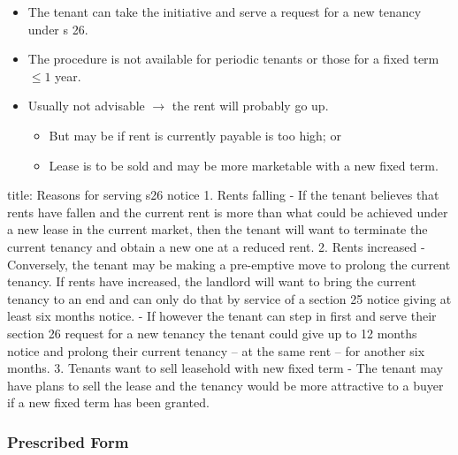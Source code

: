 \documentclass[
]{article}
\newenvironment{Shaded}{}{}
\newcommand{\NormalTok}[1]{#1}
\providecommand{\tightlist}{%
  \setlength{\itemsep}{0pt}\setlength{\parskip}{0pt}}
\begin{document}
\begin{itemize}
\tightlist
\item
  The tenant can take the initiative and serve a request for a new
  tenancy under s 26.
\item
  The procedure is not available for periodic tenants or those for a
  fixed term \(\leq 1\) year.
\item
  Usually not advisable \(\rightarrow\) the rent will probably go up.

  \begin{itemize}
  \tightlist
  \item
    But may be if rent is currently payable is too high; or
  \item
    Lease is to be sold and may be more marketable with a new fixed
    term.
  \end{itemize}
\end{itemize}

\begin{Shaded}
\begin{Highlighting}[]
\NormalTok{title: Reasons for serving s26 notice}
\NormalTok{1. Rents falling}
\NormalTok{    {-} If the tenant believes that rents have fallen and the current rent is more than what could be achieved under a new lease in the current market, then the tenant will want to terminate the current tenancy and obtain a new one at a reduced rent.}
\NormalTok{2. Rents increased}
\NormalTok{    {-} Conversely, the tenant may be making a pre{-}emptive move to prolong the current tenancy. If rents have increased, the landlord will want to bring the current tenancy to an end and can only do that by service of a section 25 notice giving at least six months\textquotesingle{} notice.}
\NormalTok{    {-} If however the tenant can step in first and serve their section 26 request for a new tenancy the tenant could give up to 12 months\textquotesingle{} notice and prolong their current tenancy – at the same rent – for another six months.}
\NormalTok{3. Tenants want to sell leasehold with new fixed term}
\NormalTok{    {-} The tenant may have plans to sell the lease and the tenancy would be more attractive to a buyer if a new fixed term has been granted.}
\end{Highlighting}
\end{Shaded}

\hypertarget{prescribed-form-1}{%
\subsubsection{Prescribed Form}\label{prescribed-form-1}}
\end{document}
